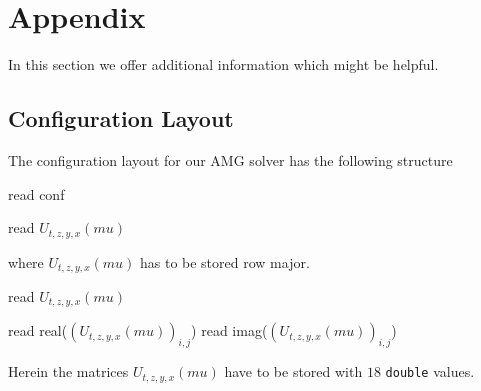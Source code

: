 \documentclass[a4paper,12pt]{scrartcl}
\begin{document}
\section{Appendix}
In this section we offer additional information which might be helpful.

\subsection{Configuration Layout}
The configuration layout for our AMG solver has the following structure
%
\begin{algorithm}[H]
  \caption{read conf}\label{readconf}
  \begin{algorithmic}[1]
		\STATE read $U_{t,z,y,x}(mu)$
	      \ENDFOR
	    \ENDFOR  
	 \ENDFOR  
      \ENDFOR  
    \ENDFOR  
  \end{algorithmic}
\end{algorithm}
%
\noindent where $U_{t,z,y,x}(mu) $ has to be stored row major.
%
\begin{algorithm}[H]
  \caption{read $U_{t,z,y,x}(mu)$}\label{readU}
  \begin{algorithmic}[1]
	\STATE read real($(U_{t,z,y,x}(mu))_{i,j}$)
	\STATE read imag($(U_{t,z,y,x}(mu))_{i,j}$)
      \ENDFOR  
    \ENDFOR
  \end{algorithmic}
\end{algorithm}
%
\noindent Herein the matrices $U_{t,z,y,x}(mu)$ have to be stored with $18$ \texttt{double} values.



\end{document}
